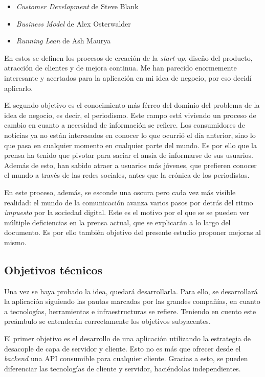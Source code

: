 \begin{itemize}
	\item \textit{Customer Development} de Steve Blank
	\item \textit{Business Model} de Alex Osterwalder
	\item \textit{Running Lean} de Ash Maurya
\end{itemize}

En estos se definen los procesos de creación de la \textit{start-up}, diseño del producto, atracción de clientes y de mejora continua. Me han parecido enormemente interesante y acertados para la aplicación en mi idea de negocio, por eso decidí aplicarlo.

El segundo objetivo es el conocimiento más férreo del dominio del problema de la idea de negocio, es decir, el periodismo. Este campo está viviendo un proceso de cambio en cuanto a necesidad de información se refiere. Los consumidores de noticias ya no están interesados en conocer lo que ocurrió el día anterior, sino lo que pasa en cualquier momento en cualquier parte del mundo. Es por ello que la prensa ha tenido que pivotar para saciar el ansia de informarse de sus usuarios. Además de esto, han sabido atraer a usuarios más jóvenes, que prefieren conocer el mundo a través de las redes sociales, antes que la crónica de los periodistas.

En este proceso, además, se esconde una oscura pero cada vez más visible realidad: el mundo de la comunicación avanza varios pasos por detrás del ritmo \textit{impuesto} por la sociedad digital. Este es el motivo por el que se se pueden ver múltiple deficiencias en la prensa actual, que se explicarán a lo largo del documento. Es por ello también objetivo del presente estudio proponer mejoras al mismo.

\subsection{Objetivos técnicos}

Una vez se haya probado la idea, quedará desarrollarla. Para ello, se desarrollará la aplicación siguiendo las pautas marcadas por las grandes compañías, en cuanto a tecnologías, herramientas e infraestructuras se refiere. Teniendo en cuento este preámbulo se entenderán correctamente los objetivos subyacentes.

El primer objetivo es el desarrollo de una aplicación utilizando la estrategia de desacople de capa de servidor y cliente. Esto no es más que ofrecer desde el \textit{backend} una API consumible para cualquier cliente. Gracias a esto, se pueden diferenciar las tecnologías de cliente y servidor, haciéndolas independientes.

